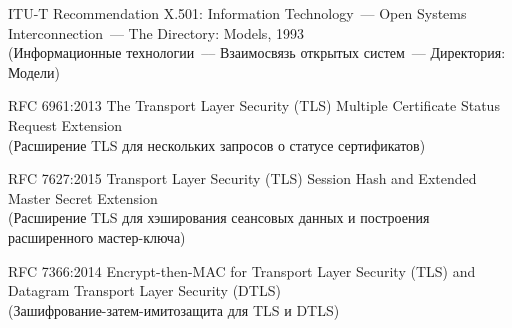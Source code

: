 \begin{thebibliography}{999}
ITU-T Recommendation X.501: 
Information Technology~--- Open Systems Interconnection~--- 
The Directory: Models, 1993\\ 
{\small (Информационные технологии~--– Взаимосвязь открытых систем~---
Директория: Модели)}

RFC 6961:2013
The Transport Layer Security (TLS) Multiple Certificate Status 
Request Extension\\
{\small (Расширение TLS для нескольких запросов о статусе сертификатов)}

RFC 7627:2015
Transport Layer Security (TLS) Session Hash and Extended Master Secret 
Extension\\
{\small (Расширение TLS для хэширования сеансовых данных и построения 
расширенного мастер-ключа)}

RFC 7366:2014
Encrypt-then-MAC for Transport Layer Security (TLS) and Datagram Transport 
Layer Security (DTLS)\\
{\small (Зашифрование-затем-имитозащита для TLS и DTLS)}

\label{LastBib}
\end{thebibliography}

